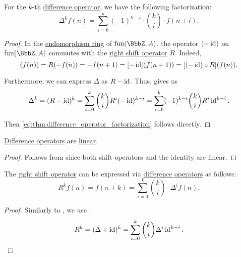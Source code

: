 \begin{proposition}\label{thm:difference_operator_factorization}
  For the \( k \)-th \hyperref[def:finite_difference_operator]{difference operator}, we have the following factorization:
  \begin{equation}\label{eq:thm:difference_operator_factorization}
    \Delta^k f(n) = \sum_{i=0}^k (-1)^{k-i} \cdot \binom k i \cdot f(n + i).
  \end{equation}
\end{proposition}
\begin{proof}
  In the \hyperref[def:endomorphism_semiring]{endomorphism ring} of \( \fun(\BbbZ, A) \), the operator \( (-\operatorname{id}) \) on \( \fun(\BbbZ, A) \) commutes with the \hyperref[def:sequence_shift_operator]{right shift operator} \( R \). Indeed,
  \begin{equation*}
    [R \bincirc (-\id)](f(n))
    =
    R(-f(n))
    =
    -f(n + 1)
    =
    [-\id](f(n + 1))
    =
    [(-\id) \bincirc R](f(n)).
  \end{equation*}

  Furthermore, we can express \( \Delta \) as \( R - \operatorname{id} \). Thus,  gives us
  \begin{equation*}
    \Delta^k
    =
    (R - \operatorname{id})^k
    =
    \sum_{i=0}^k \binom k i R^i (-\operatorname{id})^{k-i}
    =
    \sum_{i=0}^k (-1)^{k-i} \binom k i R^i \operatorname{id}^{k-i}.
  \end{equation*}

  Then \eqref{eq:thm:difference_operator_factorization} follows directly.
\end{proof}

\begin{corollary}\label{thm:difference_operator_linearity}
  \hyperref[def:finite_difference_operator]{Difference operators} are \hyperref[def:linear_function]{linear}.
\end{corollary}
\begin{proof}
  Follows from  since both shift operators and the identity are linear.
\end{proof}

\begin{proposition}\label{thm:successive_value_via_difference_operator}
  The \hyperref[def:sequence_shift_operator]{right shift operator} can be expressed via \hyperref[def:finite_difference_operator]{difference operators} as follows:
  \begin{equation}\label{eq:thm:successive_value_via_difference_operator}
    R^k f(n)
    =
    f(n + k)
    =
    \sum_{i=0}^k \binom k i \cdot \Delta^i f(n).
  \end{equation}
\end{proposition}
\begin{proof}
  Similarly to , we use :
  \begin{equation*}
    R^k
    =
    (\Delta + \operatorname{id})^k
    =
    \sum_{i=0}^k \binom k i \Delta^i \operatorname{id}^{k-i}.
  \end{equation*}
\end{proof}

